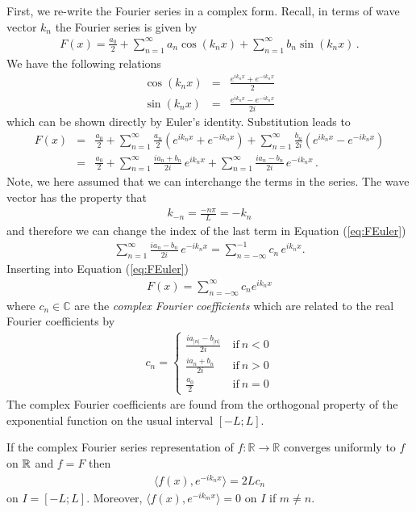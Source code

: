First, we re-write the Fourier series in a complex form. Recall, in terms of wave vector 
$k_n$ the Fourier series is given by
\begin{eqnarray}
	F(x) = \frac{a_0}{2} + \sum_{n=1}^\infty a_n\cos(k_n x) + \sum_{n=1}^\infty b_n \sin(k_n x) \, .
\end{eqnarray}
We have the following relations
\begin{eqnarray}
	\label{eq:euler2ndidentity}
	\cos(k_n x) &=& \frac{e^{ik_n x} + e^{-ik_nx}}{2}  \nonumber \\
	\sin(k_n x) &=& \frac{e^{ik_n x} - e^{-ik_nx}}{2i}   
\end{eqnarray}
which can be shown directly by Euler's identity. Substitution leads to 
\begin{eqnarray}
	F(x) &=&  \frac{a_0}{2}+ \sum_{n=1}^\infty\frac{a_n}{2}(e^{ik_nx}+e^{-ik_nx}) + \sum_{n=1}^\infty \frac{b_n}{2i} ( e^{ik_nx}-e^{-ik_nx}) 
	\nonumber \\
	 &=&  \frac{a_0}{2}+ \sum_{n=1}^\infty\frac{ia_n+b_n}{2i}\, e^{ik_nx} + \sum_{n=1}^\infty \frac{ia_n - b_n}{2i} \, e^{-ik_nx} 
	 \label{eq:FEuler} \, .
\end{eqnarray}
Note, we here assumed that we can interchange the terms in the series. The wave vector has the property that
\begin{eqnarray}
	k_{-n} = \frac{-n\pi}{L} = -k_n
\end{eqnarray}
and therefore we can change the index of the last term in Equation (\ref{eq:FEuler})
\begin{eqnarray}
	\sum_{n=1}^\infty \frac{ia_n - b_n}{2i} \, e^{-ik_nx} =
	\sum_{n=-\infty}^{-1} c_n \, e^{ik_nx}.  
\end{eqnarray}
Inserting into Equation
(\ref{eq:FEuler})  
\begin{eqnarray}
	F(x) = \sum_{n=-\infty}^\infty c_n e^{i k_n x}
\end{eqnarray}
where $c_n \in \mathbb{C}$ are the \emph{complex Fourier coefficients}  which 
are related to the real Fourier coefficients by
\begin{eqnarray}
	c_n = \left\{
		\begin{array}{ll}
			\frac{ia_{|n|} - b_{|n|}}{2i} \ & \text{if} \ n < 0 \\
			\frac{ia_{n} + b_{n}}{2i} \ & \text{if} \ n > 0 \\
			\frac{a_0}{2} \ & \text{if} \ n = 0
		\end{array}	
	\right.
\end{eqnarray}
The complex Fourier coefficients are found from the orthogonal property of the exponential function on the
usual interval $[-L;L]$.
\begin{theorem}
	If the complex Fourier series representation of $f:\mathbb{R} \rightarrow \mathbb{R}$ converges uniformly
	to $f$ on $\mathbb{R}$ and $f = F$ then
	\begin{eqnarray}
		\langle f(x), e^{-ik_n x} \rangle = 2 L c_n  
	\end{eqnarray}
	on $I=[-L; L]$. Moreover, $\langle f(x), e^{-ik_m x} \rangle = 0$ on $I$ if $m \neq n$. 
\end{theorem}

